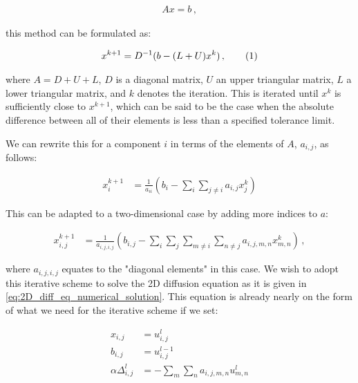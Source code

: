 \documentclass[reprint,english,notitlepage]{revtex4-1}  %
\newcommand\numberthis{\addtocounter{equation}{1}\tag{\theequation}}
\begin{document}
\begin{align*}
Ax = b \, ,
\end{align*}

this method can be formulated as:

\begin{align*}
x^{k+1} = D^{-1}(b - (L+U)x^k) \, , \numberthis \label{eq:jacobi_iterative_method}
\end{align*}

where $A = D + U + L$, $D$ is a diagonal matrix, $U$ an upper triangular matrix, $L$ a lower triangular matrix, and $k$ denotes the iteration. This is iterated until $x^k$ is sufficiently close to $x^{k+1}$, which can be said to be the case when the absolute difference between all of their elements is less than a specified tolerance limit.



We can rewrite this for a component $i$ in terms of the elements of $A$, $a_{i,j}$, as follows:

\begin{align*}
x^{k+1}_i &= \frac{1}{a_{ii}} ( b_i - \sum\limits_i \sum\limits_{j\neq i} a_{i,j} x_j^k)
\end{align*}

This can be adapted to a two-dimensional case by adding more indices to $a$:

\begin{align*}
x_{i,j}^{k+1} &= \frac{1}{a_{i,j,i,j}} (b_{i,j} - \sum\limits_i \sum\limits_j \sum\limits_{m\neq i} \sum\limits_{n \neq j} a_{i,j,m,n} x_{m,n}^k ) \, ,
\end{align*}

where $a_{i,j,i,j}$ equates to the "diagonal elements" in this case. We wish to adopt this iterative scheme to solve the 2D diffusion equation as it is given in \eqref{eq:2D_diff_eq_numerical_solution}. This equation is already nearly on the form of what we need for the iterative scheme if we set:

\begin{align*}
x_{i,j} &= u_{i,j}^l \\
b_{i,j} &= u_{i,j}^{l-1} \\
\alpha \Delta_{i,j}^l &= -\sum\limits_m \sum\limits_n a_{i,j,m,n}  u_{m,n}^l
\end{align*} 
\end{document}
